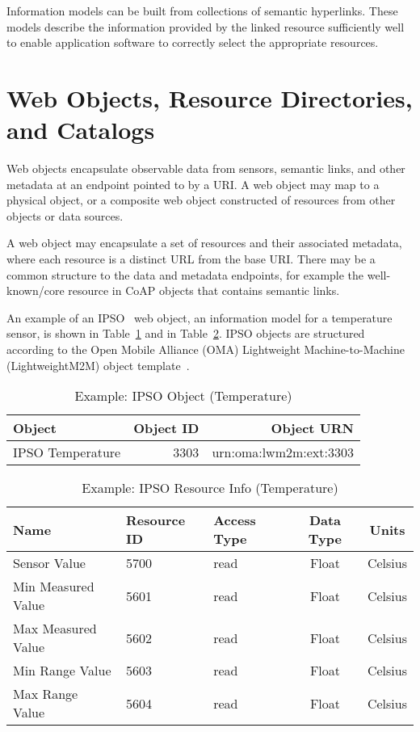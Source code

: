 \documentclass[journal]{IEEEtran}
\begin{document}
Information models can be built from collections of semantic hyperlinks. These models describe the information provided by the linked resource sufficiently well to enable application software to correctly select the appropriate resources. 

\section{Web Objects, Resource Directories, and Catalogs}
Web objects encapsulate observable data from sensors, semantic links, and other metadata at an endpoint pointed to by a URI. A web object may map to a physical object, or a composite web object constructed of resources from other objects or data sources.

A web object may encapsulate a set of resources and their associated metadata, where each resource is a distinct URL from the base URI. There may be a common structure to the data and metadata endpoints, for example the well-known/core resource in CoAP objects that contains semantic links.

An example of an IPSO~\cite{IPSO} web object, an information model for a temperature sensor, is shown in Table~\ref{ipso-temperature} and in Table~\ref{ipso-temperature-resource}. IPSO objects are structured according to the Open Mobile Alliance (OMA) Lightweight Machine-to-Machine (LightweightM2M) object template~\cite{LWM2M}.

\begin{table}[htdp]
\caption{Example: IPSO Object (Temperature)}
\begin{center}
\begin{tabular}{|l|r|r|}
\hline
\textbf{Object} & \textbf{Object ID} & \textbf{Object URN}\\
\hline\hline
IPSO Temperature & 3303 & urn:oma:lwm2m:ext:3303 \\ 
\hline
\end{tabular}
\end{center}
\label{ipso-temperature}
\end{table}

\begin{table}[htdp]
\caption{Example: IPSO Resource Info (Temperature)}
\begin{center}
\begin{tabular}{|p{2cm}|p{1cm}|p{1cm}|c|c|}
\hline
\textbf{Name} & \textbf{Resource ID} & \textbf{Access Type} & \textbf{Data Type} & \textbf{Units} \\
\hline\hline
Sensor Value & 5700 & read & Float & Celsius\\ 
\hline
Min Measured Value & 5601 & read & Float & Celsius \\
\hline
Max Measured Value & 5602 & read & Float & Celsius \\
\hline 
Min Range Value & 5603 & read & Float & Celsius \\
\hline
Max Range Value & 5604 & read & Float & Celsius \\
\hline 
\end{tabular}
\end{center}
\label{ipso-temperature-resource}
\end{table}
\end{document}
